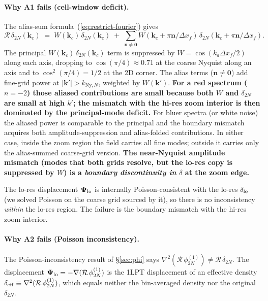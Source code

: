 \documentclass[12pt]{article}
\newcommand{\toyn}{-2}
\newcommand{\R}{\mathcal{R}}
\begin{document}
\paragraph{Why A1 fails (cell-window deficit).}
The alias-sum formula~(\ref{eq:restrict-fourier}) gives
\begin{equation}
  \R\,\delta_{2N}(\mathbf k_c) \;=\; W(\mathbf k_c)\,\delta_{2N}(\mathbf k_c)
  \;+\; \sum_{\mathbf n\ne\mathbf 0} W(\mathbf k_c+\pi\mathbf n/\Delta x_f)\,\delta_{2N}(\mathbf k_c+\pi\mathbf n/\Delta x_f).
\end{equation}
The principal $W(\mathbf k_c)\,\delta_{2N}(\mathbf k_c)$ term is
suppressed by $W = \cos(k_a\Delta x_f/2)$ along each axis, dropping
to $\cos(\pi/4)\approx 0.71$ at the coarse Nyquist along an axis and
to $\cos^2(\pi/4)=1/2$ at the 2D corner. The alias terms
($\mathbf n\ne\mathbf 0$) add fine-grid power at $|\mathbf k'| >
k_{\mathrm{Ny},N}$, weighted by $W(\mathbf k')$. \textbf{For a red spectrum
($n=\toyn$) those aliased contributions are small because both $W$
and $\delta_{2N}$ are small at high $k'$; the mismatch with the
hi-res zoom interior is then dominated by the principal-mode deficit.}
For bluer spectra (or white noise) the aliased power is comparable to
the principal and the boundary mismatch acquires both
amplitude-suppression and alias-folded contributions. In either case,
inside the zoom region the field carries all fine modes; outside it
carries only the alias-summed coarse-grid version. \textbf{The near-Nyquist
amplitude mismatch (modes that both grids resolve, but the lo-res copy
is suppressed by $W$) is a \emph{boundary discontinuity in $\delta$}
at the zoom edge.}

The lo-res displacement $\boldsymbol{\Psi}_{\rm lo}$ is internally
Poisson-consistent with the lo-res $\delta_{\rm lo}$ (we solved Poisson
on the coarse grid sourced by it), so there is no inconsistency
\emph{within} the lo-res region. The failure is the boundary mismatch
with the hi-res zoom interior.

\paragraph{Why A2 fails (Poisson inconsistency).}
The Poisson-inconsistency result of \S\ref{sec:phi} says
$\nabla^2(\R\,\phi^{(1)}_{2N}) \neq \R\,\delta_{2N}$. The displacement
$\boldsymbol{\Psi}_{\rm lo} = -\nabla(\R\,\phi^{(1)}_{2N})$ is the
1LPT displacement of an effective density
$\delta_{\rm eff} \equiv \nabla^2(\R\,\phi^{(1)}_{2N})$, which equals
neither the bin-averaged density nor the original $\delta_{2N}$.
\end{document}
